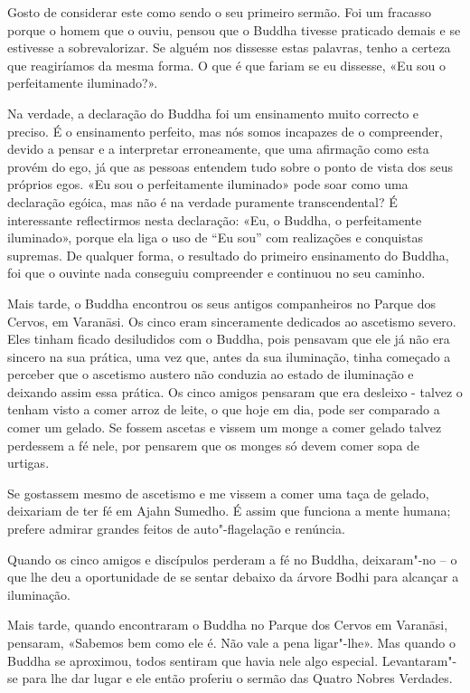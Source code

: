 \enlargethispage{\baselineskip}

Gosto de considerar este como sendo o seu primeiro sermão. Foi um fracasso
porque o homem que o ouviu, pensou que o Buddha tivesse praticado demais e se
estivesse a sobrevalorizar. Se alguém nos dissesse estas palavras, tenho a
certeza que reagiríamos da mesma forma. O que é que fariam se eu dissesse, «Eu
sou o perfeitamente iluminado?».

Na verdade, a declaração do Buddha foi um ensinamento muito correcto e preciso.
É o ensinamento perfeito, mas nós somos incapazes de o compreender, devido a
pensar e a interpretar erroneamente, que uma afirmação como esta provém do ego,
já que as pessoas entendem tudo sobre o ponto de vista dos seus próprios egos.
«Eu sou o perfeitamente iluminado» pode soar como uma declaração egóica, mas não
é na verdade puramente transcendental? É interessante reflectirmos nesta declaração: 
«Eu, o Buddha, o perfeitamente iluminado», porque ela liga o uso de
“Eu sou” com realizações e conquistas supremas. De qualquer forma, o resultado
do primeiro ensinamento do Buddha, foi que o ouvinte nada conseguiu compreender
e continuou no seu caminho.

\enlargethispage{\baselineskip}

Mais tarde, o Buddha encontrou os seus antigos companheiros no Parque dos
Cervos, em Varanāsi. Os cinco eram sinceramente dedicados ao ascetismo severo.
Eles tinham ficado desiludidos com o Buddha, pois pensavam que ele já não era
sincero na sua prática, uma vez que, antes da sua iluminação, tinha começado a
perceber que o ascetismo austero não conduzia ao estado de iluminação e deixando assim essa prática. Os cinco amigos pensaram que era desleixo - talvez o tenham
visto a comer arroz de leite, o que hoje em dia, pode ser comparado a comer um
gelado. Se fossem ascetas e vissem um monge a comer gelado talvez perdessem a fé
nele, por pensarem que os monges só devem comer sopa de urtigas.

Se gostassem mesmo de ascetismo e me vissem a comer uma taça de gelado,
deixariam de ter fé em Ajahn Sumedho. É assim que funciona a mente humana;
prefere admirar grandes feitos de auto"-flagelação e renúncia.

Quando os cinco amigos e discípulos perderam a fé no Buddha, deixaram"-no – o que
lhe deu a oportunidade de se sentar debaixo da árvore Bodhi para alcançar a
iluminação.

Mais tarde, quando encontraram o Buddha no Parque dos Cervos em Varanāsi,
pensaram, «Sabemos bem como ele é. Não vale a pena ligar"-lhe». Mas quando o
Buddha se aproximou, todos sentiram que havia nele algo especial. Levantaram"-se
para lhe dar lugar e ele então proferiu o sermão das Quatro Nobres Verdades.

